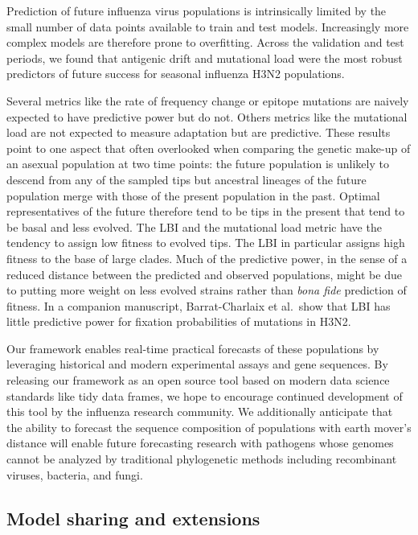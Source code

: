 Prediction of future influenza virus populations is intrinsically limited by the small number of data points available to train and test models.
Increasingly more complex models are therefore prone to overfitting.
Across the validation and test periods, we found that antigenic drift and mutational load were the most robust predictors of future success for seasonal influenza H3N2 populations.

Several metrics like the rate of frequency change or epitope mutations are naively expected to have predictive power but do not.
Others metrics like the mutational load are not expected to measure adaptation but are predictive.
These results point to one aspect that often overlooked when comparing the genetic make-up of an asexual population at two time points: the future population is unlikely to descend from any of the sampled tips but ancestral lineages of the future population merge with those of the present population in the past.
Optimal representatives of the future therefore tend to be tips in the present that tend to be basal and less evolved.
The LBI and the mutational load metric have the tendency to assign low fitness to evolved tips.
The LBI in particular assigns high fitness to the base of large clades.
Much of the predictive power, in the sense of a reduced distance between the predicted and observed populations, might be due to putting more weight on less evolved strains rather than \emph{bona fide} prediction of fitness.
In a companion manuscript, Barrat-Charlaix et al.~show that LBI has little predictive power for fixation probabilities of mutations in H3N2.

Our framework enables real-time practical forecasts of these populations by leveraging historical and modern experimental assays and gene sequences.
By releasing our framework as an open source tool based on modern data science standards like tidy data frames, we hope to encourage continued development of this tool by the influenza research community.
We additionally anticipate that the ability to forecast the sequence composition of populations with earth mover's distance will enable future forecasting research with pathogens whose genomes cannot be analyzed by traditional phylogenetic methods including recombinant viruses, bacteria, and fungi.

\subsection*{Model sharing and extensions}

